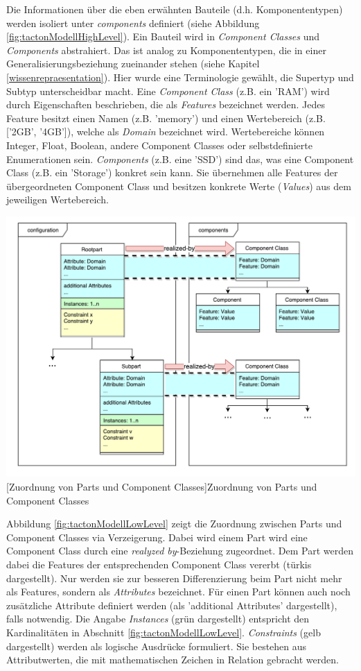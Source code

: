 \documentclass[11pt, a4paper, titlepage, listof=totoc, bibliography=totoc, index=totoc, twoside, openright, headings=normal, draft]{scrreprt}
\begin{document}
Die Informationen über die eben erwähnten Bauteile (d.h. Komponententypen) werden isoliert unter \emph{components} definiert (siehe Abbildung \ref{fig:tactonModellHighLevel}). Ein Bauteil wird in \emph{Component Classes} und \emph{Components} abstrahiert. Das ist analog zu Komponententypen, die in einer Generalisierungsbeziehung zueinander stehen (siehe Kapitel \ref{wissenrepraesentation}). Hier wurde eine Terminologie gewählt, die Supertyp und Subtyp unterscheidbar macht. Eine \emph{Component Class} (z.B. ein 'RAM') wird durch Eigenschaften beschrieben, die als \emph{Features} bezeichnet werden. Jedes Feature besitzt einen Namen (z.B. 'memory') und einen Wertebereich (z.B. ['2GB', '4GB']), welche als \emph{Domain} bezeichnet wird. Wertebereiche können Integer, Float, Boolean, andere Component Classes oder selbstdefinierte Enumerationen sein. \emph{Components} (z.B. eine 'SSD') sind das, was eine Component Class (z.B. ein 'Storage') konkret sein kann. Sie übernehmen alle Features der übergeordneten Component Class und besitzen konkrete Werte (\emph{Values}) aus dem jeweiligen Wertebereich.

\vspace{1em}
\begin{minipage}{\linewidth}
	\centering
	\includegraphics[width=0.8\linewidth]{Abbildungen/tactonModellLowLevel.pdf}
	[Zuordnung von Parts und Component Classes]{Zuordnung von Parts und Component Classes}
	\label{fig:tactonModellLowLevel}
\end{minipage}
\vspace{0.2em}

Abbildung \ref{fig:tactonModellLowLevel} zeigt die Zuordnung zwischen Parts und Component Classes via Verzeigerung. Dabei wird einem Part wird eine Component Class durch eine \emph{realyzed by}-Beziehung zugeordnet. Dem Part werden dabei die Features der entsprechenden Component Class vererbt (türkis dargestellt). Nur werden sie zur besseren Differenzierung beim Part nicht mehr als Features, sondern als \emph{Attributes} bezeichnet. Für einen Part können auch noch zusätzliche Attribute definiert werden (als 'additional Attributes' dargestellt), falls notwendig. Die Angabe \emph{Instances} (grün dargestellt) entspricht den Kardinalitäten in Abschnitt \ref{fig:tactonModellLowLevel}. \emph{Constraints} (gelb dargestellt) werden als logische Ausdrücke formuliert. Sie bestehen aus Attributwerten, die mit mathematischen Zeichen in Relation gebracht werden.
\end{document}
